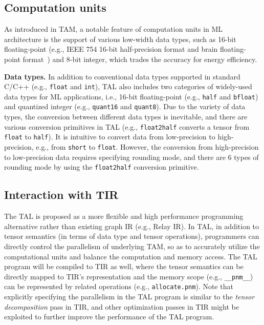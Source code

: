 \subsection{Computation units}
As introduced in TAM, a notable feature of computation units in ML architecture is the support of various low-width data types, such as 16-bit floating-point (e.g., IEEE 754 16-bit half-precision format and brain floating-point format~\cite{bfloat16}) and 8-bit integer, which trades the accuracy for energy efficiency.

\textbf{Data types.} In addition to conventional data types supported in standard C/C++ (e.g., \texttt{float} and \texttt{int}), TAL also includes two categories of widely-used data types for ML applications, i.e., 16-bit floating-point (e.g., \texttt{half} and \texttt{bfloat}) and quantized integer (e.g., \texttt{quant16} and \texttt{quant8}). Due to the variety of data types, the conversion between different data types is inevitable, and there are various conversion primitives in TAL (e.g., \texttt{float2half} converts a tensor from \texttt{float} to \texttt{half}). It is intuitive to convert data from low-precision to high-precision, e.g., from \texttt{short} to \texttt{float}. However, the conversion from high-precision to low-precision data requires specifying rounding mode, and there are $6$ types of rounding mode by using the \texttt{float2half} conversion primitive.%

\subsection{Interaction with TIR}
The TAL is proposed as a more flexible and high performance programming alternative rather than existing graph IR (e.g., Relay IR). In TAL, in addition to tensor semantics (in terms of data type and tensor operations), programmers can directly control the parallelism of underlying TAM, so as to accurately utilize the computational units and balance the computation and memory access. The TAL program will be compiled to TIR as well, where the tensor semantics can be directly mapped to TIR's representation and the memory scope (e.g., \texttt{\_\_pnm\_\_}) can be represented by related operations (e.g., \texttt{allocate.pnm}). Note that explicitly specifying the parallelism in the TAL program is similar to the \emph{tensor decomposition} pass in TIR, and other optimization passes in TIR might be exploited to further improve the performance of the TAL program.


